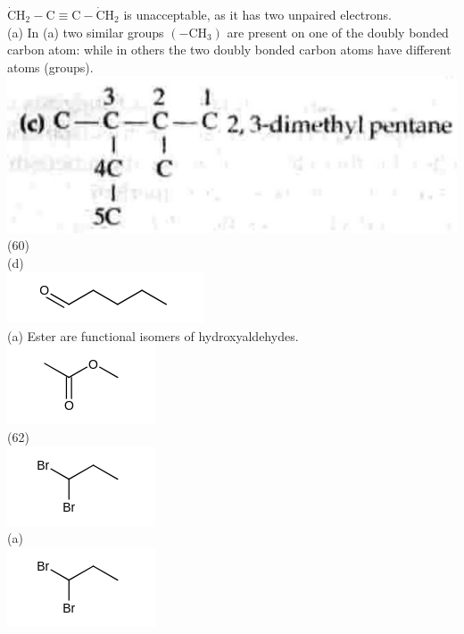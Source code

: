 \documentclass[10pt]{article}
\begin{document}
$\dot{\mathrm{C}} \mathrm{H}_{2}-\mathrm{C} \equiv \mathrm{C}-\dot{\mathrm{C}} \mathrm{H}_{2}$ is unacceptable, as it has two unpaired electrons.\\
(a) In (a) two similar groups $\left(-\mathrm{CH}_{3}\right)$ are present on one of the doubly bonded carbon atom: while in others the two doubly bonded carbon atoms have different atoms (groups).\\
\includegraphics[max width=\textwidth, center]{2025_01_28_8470952b98110cec3aabg-159(1)}\\
(60)\\
(d)\\
\includegraphics{smile-9ed9b9a7183084feb22a6a07a61ec70574a5665d}\\
(a) Ester are functional isomers of hydroxyaldehydes.\\
\includegraphics{smile-4d2b1b4f032b68483d1f158348ffbd7ed677136f}\\
(62)\\
\includegraphics{smile-1c50fd6046a304bc85f51912a6c9852c3897e0e6}\\
(a)\\
\includegraphics{smile-2d27cd1a64715be3f3ba89ccc442649393c182fe}
\end{document}
